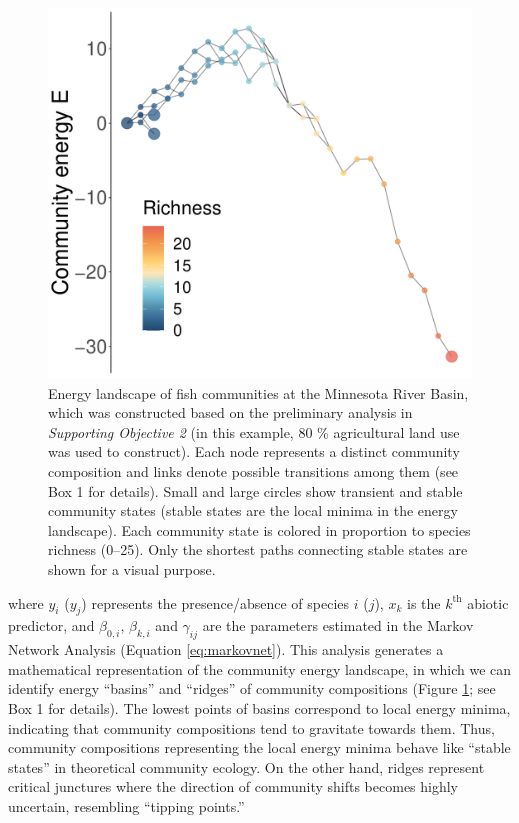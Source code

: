 \documentclass[12pt, class=article, crop=false]{standalone}
\begin{document}
\begin{figure}
    \includegraphics[scale=0.275]{output/fig_ela_mrb.pdf}
    \caption{Energy landscape of fish communities at the Minnesota River Basin, which was constructed based on the preliminary analysis in \textit{Supporting Objective 2} (in this example, 80 \% agricultural land use was used to construct). Each node represents a distinct community composition and links denote possible transitions among them (see Box 1 for details). Small and large circles show transient and stable community states (stable states are the local minima in the energy landscape). Each community state is colored in proportion to species richness (0--25). Only the shortest paths connecting stable states are shown for a visual purpose.}
    \label{fig:ela}
\end{figure}

where $y_i$ ($y_j$) represents the presence/absence of species $i$ ($j$), $x_k$ is the $k^{\text{th}}$ abiotic predictor, and $\beta_{0,i}$, $\beta_{k,i}$ and $\gamma_{ij}$ are the parameters estimated in the Markov Network Analysis (Equation \ref{eq:markovnet}).
This analysis generates a mathematical representation of the community energy landscape, in which we can identify energy ``basins'' and ``ridges'' of community compositions (Figure \ref{fig:ela}; see Box 1 for details).
The lowest points of basins correspond to local energy minima, indicating that community compositions tend to gravitate towards them.
Thus, community compositions representing the local energy minima behave like ``stable states'' in theoretical community ecology.
On the other hand, ridges represent critical junctures where the direction of community shifts becomes highly uncertain, resembling ``tipping points.''
\end{document}
